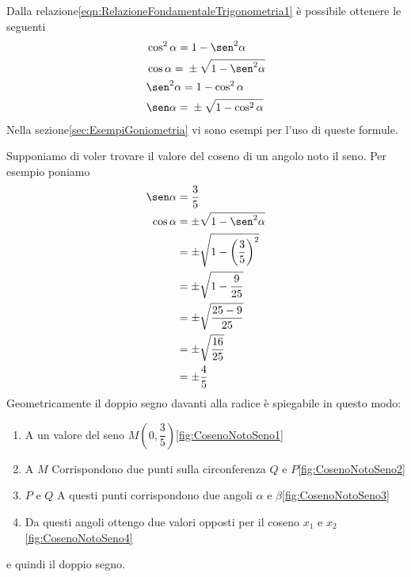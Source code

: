 Dalla relazione\nobs\vref{eqn:RelazioneFondamentaleTrigonometria1} è possibile ottenere le seguenti
\begin{align*}
&\cos^{2}\alpha={}1-\sen^{2}\alpha\\
&\cos\alpha={}\pm\sqrt{1-\sen^{2}\alpha}\\
&\sen^{2}\alpha={}1-\cos^{2}\alpha \\
&\sen\alpha={}\pm\sqrt{1-\cos^{2}\alpha}
\end{align*}
Nella sezione\nobs\vref{sec:EsempiGoniometria} vi sono esempi per l'uso di queste formule. 

Supponiamo di voler trovare il valore del coseno di un angolo noto il seno. Per esempio poniamo 
\begin{align*}
\sen\alpha&{}=\dfrac{3}{5}\\
\cos\alpha&=\pm\sqrt{1-\sen^2\alpha}\\
&=\pm\sqrt{1-\left(\dfrac{3}{5}\right)^2}\\
&=\pm\sqrt{1-\dfrac{9}{25}}\\
&=\pm\sqrt{\dfrac{25-9}{25}}\\
&=\pm\sqrt{\dfrac{16}{25}} \\
&=\pm\dfrac{4}{5} 
\end{align*}
Geometricamente il doppio segno davanti alla radice è spiegabile in questo modo:
\begin{enumerate}
	\item A un valore del seno $M(0,\dfrac{3}{5})$\nobs\vref{fig:CosenoNotoSeno1}
	\item A $M$ Corrispondono due punti sulla circonferenza $Q$ e $P$\nobs\vref{fig:CosenoNotoSeno2}
	\item $P$ e $Q$ A questi punti corrispondono due angoli $\alpha$ e $\beta$\nobs\vref{fig:CosenoNotoSeno3}
	\item  Da questi angoli ottengo due valori opposti per il coseno $x_1$ e $x_2$\nobs\vref{fig:CosenoNotoSeno4}
	\end{enumerate}
e quindi il doppio segno.

